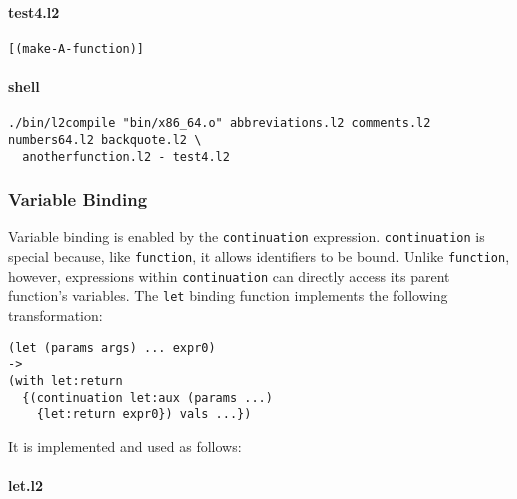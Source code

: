 \documentclass[]{article}
\let\oldparagraph\paragraph
\renewcommand{\paragraph}[1]{\oldparagraph{#1}\mbox{}}
\begin{document}
\paragraph{test4.l2}\label{test4.l2}

\begin{verbatim}
[(make-A-function)]
\end{verbatim}

\paragraph{shell}\label{shell-3}

\begin{verbatim}
./bin/l2compile "bin/x86_64.o" abbreviations.l2 comments.l2 numbers64.l2 backquote.l2 \
  anotherfunction.l2 - test4.l2
\end{verbatim}

\hypertarget{variable-binding}{\subsubsection{Variable
Binding}\label{variable-binding}}

Variable binding is enabled by the \texttt{continuation} expression.
\texttt{continuation} is special because, like \texttt{function}, it
allows identifiers to be bound. Unlike \texttt{function}, however,
expressions within \texttt{continuation} can directly access its parent
function's variables. The \texttt{let} binding function implements the
following transformation:

\begin{verbatim}
(let (params args) ... expr0)
->
(with let:return
  {(continuation let:aux (params ...)
    {let:return expr0}) vals ...})
\end{verbatim}

It is implemented and used as follows:

\paragraph{let.l2}\label{let.l2}
\end{document}
